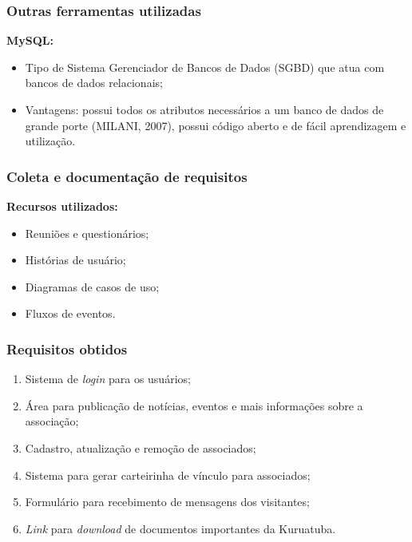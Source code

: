 \documentclass[xcolor=table]{beamer}
\begin{document}
\begin{frame}
    \frametitle{Outras ferramentas utilizadas}
    \textbf{MySQL:} 
    \begin{itemize}
        \item Tipo de Sistema Gerenciador de Bancos de Dados (SGBD) que atua com bancos de dados relacionais; %
        \item Vantagens: possui todos os atributos necessários a um banco de dados de grande porte (MILANI, 2007), possui código aberto e de fácil aprendizagem e utilização. 
    \end{itemize}
    
\end{frame}



\begin{frame}
    \frametitle{Coleta e documentação de requisitos}
    \textbf{Recursos utilizados:}
    \begin{itemize}
        \item Reuniões e questionários;
        \item Histórias de usuário;
        \item Diagramas de casos de uso;
        \item Fluxos de eventos.
    \end{itemize}
\end{frame}

\begin{frame}
    \frametitle{Requisitos obtidos} %
    \begin{enumerate}
     \item Sistema de \textit{login} para os usuários;
     \item Área para publicação de notícias, eventos e mais informações sobre a associação;
     \item Cadastro, atualização e remoção de associados;
     \item Sistema para gerar carteirinha de vínculo para associados;
     \item Formulário para recebimento de mensagens dos visitantes;
     \item \textit{Link} para \textit{download} de documentos importantes da Kuruatuba.
    \end{enumerate}

\end{frame}
\end{document}
